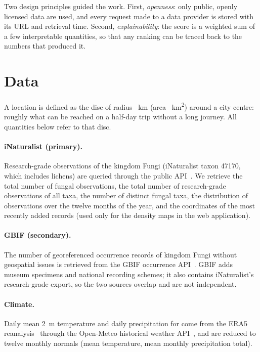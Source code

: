 \documentclass[11pt,a4paper]{article}
\begin{document}
Two design principles guided the work. First, \emph{openness}: only public, openly licensed data are used,
and every request made to a data provider is stored with its URL and retrieval time. Second,
\emph{explainability}: the score is a weighted sum of a few interpretable quantities, so that any ranking
can be traced back to the numbers that produced it.

\section{Data}\label{sec:data}

A location is defined as the disc of radius \MLSRadiusKm{}~km (area \MLSAreaKm{}~km\textsuperscript{2})
around a city centre: roughly what can be reached on a half-day trip without a long journey.
All quantities below refer to that disc.

\paragraph{iNaturalist (primary).} Research-grade observations of the kingdom Fungi (iNaturalist taxon
47170, which includes lichens) are queried through the public API~\cite{inat}. We retrieve the total number
of fungal observations, the total number of research-grade observations of all taxa, the number of distinct
fungal taxa, the distribution of observations over the twelve months of the year, and the coordinates of
the \MLSSampleCap{} most recently added records (used only for the density maps in the web application).

\paragraph{GBIF (secondary).} The number of georeferenced occurrence records of kingdom Fungi without
geospatial issues is retrieved from the GBIF occurrence API~\cite{gbif}. GBIF adds museum specimens and
national recording schemes; it also contains iNaturalist's research-grade export, so the two sources
overlap and are not independent.

\paragraph{Climate.} Daily mean 2~m temperature and daily precipitation for \MLSClimatePeriod{} come from the
ERA5 reanalysis~\cite{era5} through the Open-Meteo historical weather API~\cite{openmeteo}, and are reduced
to twelve monthly normals (mean temperature, mean monthly precipitation total).
\end{document}
